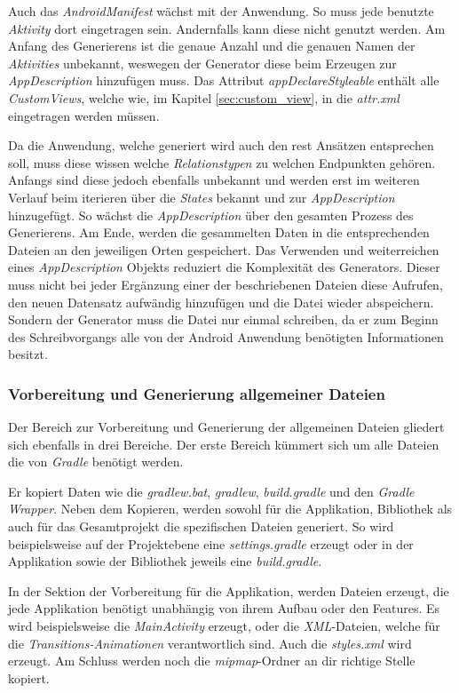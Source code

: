 Auch das \textit{AndroidManifest} wächst mit der Anwendung. So muss jede benutzte \textit{Aktivity} dort eingetragen sein. Andernfalls kann diese nicht genutzt werden. Am Anfang des Generierens ist die genaue Anzahl und die genauen Namen der \textit{Aktivities} unbekannt, weswegen der Generator diese beim Erzeugen zur \textit{AppDescription} hinzufügen muss. 
Das Attribut \textit{appDeclareStyleable} enthält alle \textit{CustomViews}, welche wie, im Kapitel \ref{sec:custom_view}, in die \textit{attr.xml} eingetragen werden müssen.

Da die Anwendung, welche generiert wird auch den \acf{rest} Ansätzen entsprechen soll, muss diese wissen welche \textit{Relationstypen} zu welchen Endpunkten gehören. Anfangs sind diese jedoch ebenfalls unbekannt und werden erst im weiteren Verlauf beim iterieren über die \textit{States} bekannt und zur \textit{AppDescription} hinzugefügt.
So wächst die \textit{AppDescription} über den gesamten Prozess des Generierens. Am Ende, werden die gesammelten Daten in die entsprechenden Dateien an den jeweiligen Orten gespeichert. Das Verwenden und weiterreichen eines \textit{AppDescription} Objekts reduziert die Komplexität des Generators. Dieser muss nicht bei jeder Ergänzung einer der beschriebenen Dateien diese Aufrufen, den neuen Datensatz aufwändig hinzufügen und die Datei wieder abspeichern. Sondern der Generator muss die Datei nur einmal schreiben, da er zum Beginn des Schreibvorgangs alle von der Android Anwendung benötigten Informationen besitzt.

\subsubsection{Vorbereitung und Generierung allgemeiner Dateien}

Der Bereich zur Vorbereitung und Generierung der allgemeinen Dateien gliedert sich ebenfalls in drei Bereiche. Der erste Bereich kümmert sich um alle Dateien die von \textit{Gradle} benötigt werden. 

Er kopiert Daten wie die \textit{gradlew.bat}, \textit{gradlew}, \textit{build.gradle} und den \textit{Gradle Wrapper}. 
Neben dem Kopieren, werden sowohl für die Applikation, Bibliothek als auch für das Gesamtprojekt die spezifischen Dateien generiert. So wird beispielsweise auf der Projektebene eine \textit{settings.gradle} erzeugt oder in der Applikation sowie der Bibliothek jeweils eine \textit{build.gradle}.

In der Sektion der Vorbereitung für die Applikation, werden Dateien erzeugt, die jede Applikation benötigt unabhängig von ihrem Aufbau oder den Features. Es wird beispielsweise die \textit{MainActivity} erzeugt, oder die \textit{XML}-Dateien, welche für die \textit{Transitions-Animationen} verantwortlich sind. Auch die \textit{styles.xml} wird erzeugt. Am Schluss werden noch die \textit{mipmap}-Ordner an dir richtige Stelle kopiert.

